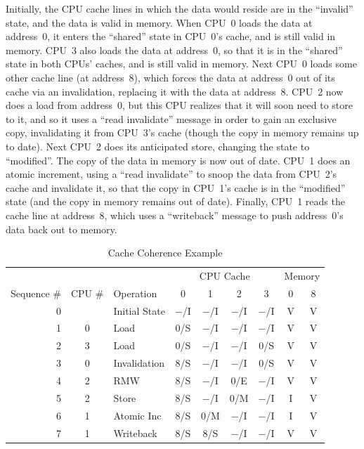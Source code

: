 Initially, the CPU cache lines in which the data would reside are
in the ``invalid'' state, and the data is valid in memory.
When CPU~0 loads the data at address~0, it enters the ``shared'' state in
CPU~0's cache, and is still valid in memory.
CPU~3 also loads the data at address~0, so that it is in the
``shared'' state in both CPUs' caches, and is still valid in memory.
Next CPU~0 loads some other cache line (at address~8),
which forces the data at address~0 out of its cache via an invalidation,
replacing it with the data at address~8.
CPU~2 now does a load from address~0, but this CPU realizes that it will
soon need to store to it, and so it uses a ``read invalidate'' message
in order to gain an exclusive copy, invalidating
it from CPU~3's cache (though the copy in memory remains up to date).
Next CPU~2 does its anticipated store, changing the state to ``modified''.
The copy of the data in memory is now out of date.
CPU~1 does an atomic increment, using a ``read invalidate'' to snoop
the data from CPU~2's cache
and invalidate it, so that the copy in CPU~1's cache is in the ``modified''
state (and the copy in memory remains out of date).
Finally, CPU~1 reads the cache line at address~8, which uses a
``writeback'' message to push address~0's data back out to memory.
\fi

\begin{table}
\small
\centering
\begin{tabular}{r|c|l||c|c|c|c||c|c}
	& & & \multicolumn{4}{c||}{CPU Cache} & \multicolumn{2}{c}{Memory} \\
	\cline{4-7}
	Sequence \# & CPU \# & Operation & 0 & 1 & 2 & 3 & 0 & 8 \\
	\hline
	\hline
	0 &   & Initial State	& $-$/I & $-$/I & $-$/I & $-$/I   & V & V \\
	\hline
	1 & 0 & Load		& 0/S &   $-$/I & $-$/I & $-$/I   & V & V \\
	\hline
	2 & 3 & Load		& 0/S &   $-$/I & $-$/I & 0/S     & V & V \\
	\hline
	3 & 0 & Invalidation	& 8/S &   $-$/I & $-$/I & 0/S     & V & V \\
	\hline
	4 & 2 & RMW		& 8/S &   $-$/I & 0/E &   $-$/I   & V & V \\
	\hline
	5 & 2 & Store		& 8/S &   $-$/I & 0/M &   $-$/I   & I & V \\
	\hline
	6 & 1 & Atomic Inc	& 8/S &   0/M &   $-$/I & $-$/I   & I & V \\
	\hline
	7 & 1 & Writeback	& 8/S &   8/S &   $-$/I & $-$/I   & V & V \\
\end{tabular}
\caption{Cache Coherence Example}
\label{tab:app:whymb:Cache Coherence Example}
\end{table}


